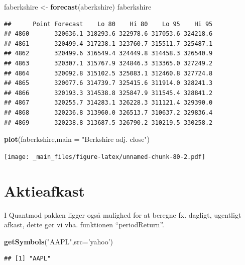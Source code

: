 \documentclass[]{book}
\newenvironment{Shaded}{\begin{snugshade}}{\end{snugshade}}
\newcommand{\DataTypeTok}[1]{\textcolor[rgb]{0.13,0.29,0.53}{#1}}
\newcommand{\KeywordTok}[1]{\textcolor[rgb]{0.13,0.29,0.53}{\textbf{#1}}}
\newcommand{\NormalTok}[1]{#1}
\newcommand{\StringTok}[1]{\textcolor[rgb]{0.31,0.60,0.02}{#1}}
\begin{document}
\begin{Shaded}
\begin{Highlighting}[]
\NormalTok{faberkshire <-}\StringTok{ }\KeywordTok{forecast}\NormalTok{(aberkshire)}
\NormalTok{faberkshire}
\end{Highlighting}
\end{Shaded}

\begin{verbatim}
##      Point Forecast    Lo 80    Hi 80    Lo 95    Hi 95
## 4860       320636.1 318293.6 322978.6 317053.6 324218.6
## 4861       320499.4 317238.1 323760.7 315511.7 325487.1
## 4862       320499.6 316549.4 324449.8 314458.3 326540.9
## 4863       320307.1 315767.9 324846.3 313365.0 327249.2
## 4864       320092.8 315102.5 325083.1 312460.8 327724.8
## 4865       320077.6 314739.7 325415.6 311914.0 328241.3
## 4866       320193.3 314538.8 325847.9 311545.4 328841.2
## 4867       320255.7 314283.1 326228.3 311121.4 329390.0
## 4868       320236.8 313960.0 326513.7 310637.2 329836.4
## 4869       320238.8 313687.5 326790.2 310219.5 330258.2
\end{verbatim}

\begin{Shaded}
\begin{Highlighting}[]
\KeywordTok{plot}\NormalTok{(faberkshire,}\DataTypeTok{main =} \StringTok{"Berkshire adj. close"}\NormalTok{)}
\end{Highlighting}
\end{Shaded}

\texttt{[image: \_main\_files/figure-latex/unnamed-chunk-80-2.pdf]}

\hypertarget{aktieafkast}{%
\section{Aktieafkast}\label{aktieafkast}}

I Quantmod pakken ligger også mulighed for at beregne fx. dagligt, ugentligt afkast, dette gør vi vha. funktionen ``periodReturn''.

\begin{Shaded}
\begin{Highlighting}[]
\KeywordTok{getSymbols}\NormalTok{(}\StringTok{"AAPL"}\NormalTok{,}\DataTypeTok{src=}\StringTok{'yahoo'}\NormalTok{)}
\end{Highlighting}
\end{Shaded}

\begin{verbatim}
## [1] "AAPL"
\end{verbatim}
\end{document}
